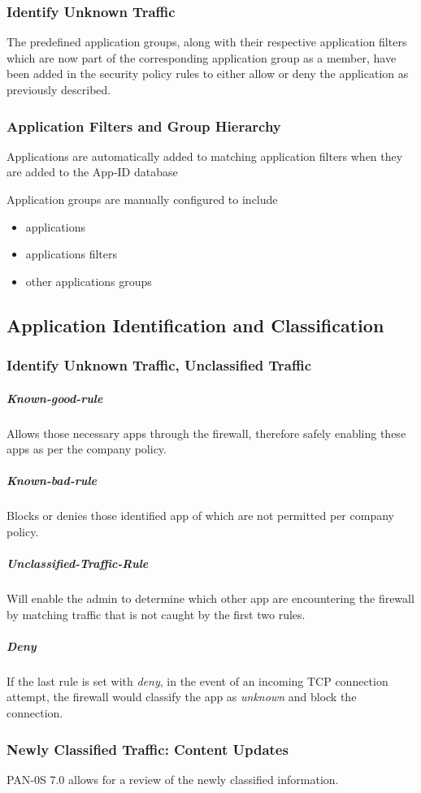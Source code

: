 \subsubsection{Identify Unknown Traffic}
The predefined application groups, along with their respective application filters which are now part of the corresponding application group as a member, 
have been added in the security policy rules to either allow or deny the application as previously described.
\subsubsection{Application Filters and Group Hierarchy}
Applications are automatically added to matching application filters when they are added to the App-ID database

Application groups are manually configured to include
    \begin{itemize}
        \item applications
        \item applications filters
        \item other applications groups
    \end{itemize}
    
\subsection{Application Identification and Classification}
\subsubsection{Identify Unknown Traffic, Unclassified Traffic}
\subparagraph{Known-good-rule} Allows those necessary apps through the firewall, therefore safely enabling these apps as per the company policy.

\subparagraph{Known-bad-rule} Blocks or denies those identified app of which are not permitted per company policy.

\subparagraph{Unclassified-Traffic-Rule} Will enable the admin to determine which other app are encountering the firewall by matching traffic that is not caught by the first two rules.

\subparagraph{Deny} If the last rule is set with \textit{deny}, in the event of an incoming TCP connection attempt, the firewall would classify the app as \textit{unknown} and block the connection.

\subsubsection{Newly Classified Traffic:  Content Updates}
PAN-0S 7.0 allows for a review of the newly classified information.

